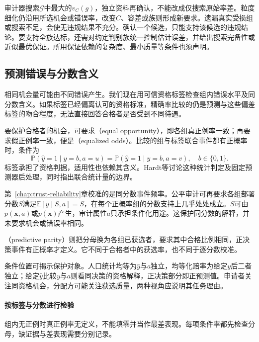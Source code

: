 审计器搜索$\mathcal G$中最大的$v_C(g)$，独立资料再确认，不能改成仅搜索原始率差。粒度细化仍沿用所选机会或错误率，改变$C$、容差或族则形成新要求。遗漏真实受损组或搜索不足，会使无违规结果不充分。确认一个候选，只能支持该候选的违规结论。要支持全族达标，还需对约定判别族统一控制估计误差，并给出搜索完备性或近似最优保证。所用保证依赖的复杂度、最小质量等条件也须声明。

\subsection{预测错误与分数含义}
\label{sec:fairness-prediction-comparison}

相同机会量可能由不同错误产生。我们现在用可信资格标签检查组内错误水平及同分数含义。如果标签已经偏离认可的资格标准，精确率比较的仍是预测与这些偏差标签的吻合程度，无法直接回答合格者是否受到不同待遇。

要保护合格者的机会，可要求（equal opportunity），即各组真正例率一致；再要求假正例率一致，便是（equalized odds）。比较的组与标签联合事件都有正概率时，条件为
\begin{equation}
 \mathbb P(\hat y=1\mid y=b,a=u)
 =\mathbb P(\hat y=1\mid y=b,a=v),
 \quad b\in\{0,1\}.
 \label{eq:fairness-equalized-odds}
\end{equation}
标签承担了资格判据，适用性也依赖其含义。Hardt等讨论这种统计判定及固定预测器后处理，同时指出联合统计量的边界。

第~\ref{chap:trust-reliability}章校准的是同分数事件频率。公平审计可再要求各组部署分数$S$满足$\mathbb E[y\mid S,a]=S$，在每个正概率组的分数支持上几乎处处成立。$S$可由$p(\bm{x},a)$或$p(\bm{x})$产生，审计属性$a$只承担条件化用途。这保护同分数的解释，并未要求机会或错误率相同。

（predictive parity）则把分母换为各组已获选者，要求其中合格比例相同，正决策事件有正概率才定义。它不同于合格者中的获选率，也不同于逐分数校准。

条件位置可揭示保护对象。人口统计均等为$\hat y$与$a$独立，均等化赔率为给定$y$后二者独立；给定$\hat y$比较$y$与$a$则看同决策的资格解释，正决策部分即正预测值。申请者关注同资格机会，分配方可能关注获选质量，两种视角应说明其任务理由。

\paragraph{按标签与分数进行检验}

组内无正例时真正例率无定义，不能填零并当作最差表现。每项条件率都先检查分母，缺证据与差表现需要分别记录。

